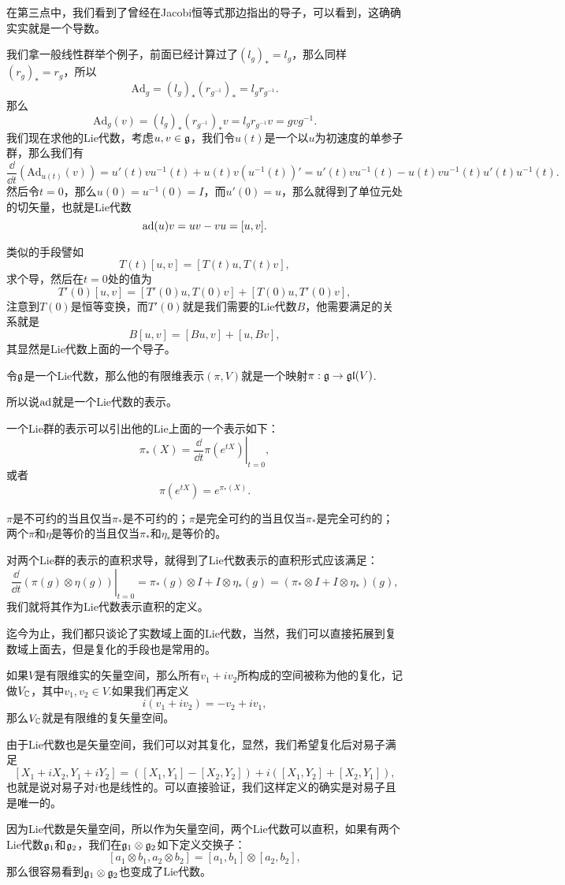 在第三点中，我们看到了曾经在Jacobi恒等式那边指出的导子，可以看到，这确确实实就是一个导数。

我们拿一般线性群举个例子，前面已经计算过了$(l_g)_*=l_g$，那么同样$(r_g)_*=r_g$，所以
\[
	\mathrm{Ad}_g=(l_g)_*(r_{g^{-1}})_*=l_gr_{g^{-1}}.
\]
那么
\[
	\mathrm{Ad}_g(v)=(l_g)_*(r_{g^{-1}})_*v=l_gr_{g^{-1}}v=gvg^{-1}.
\]
我们现在求他的Lie代数，考虑$u,v\in {\mathfrak{g}}$，我们令$u(t)$是一个以$u$为初速度的单参子群，那么我们有
\[
\frac{\dd}{\dd t}(\mathrm{Ad}_{u(t)}(v))=u'(t)vu^{-1}(t)+u(t)v(u^{-1}(t))'=u'(t)vu^{-1}(t)-u(t)vu^{-1}(t)u'(t)u^{-1}(t).
\]
然后令$t=0$，那么$u(0)=u^{-1}(0)=I$，而$u'(0)=u$，那么就得到了单位元处的切矢量，也就是Lie代数
\[
{\mathrm{ad}}(u)v=uv-vu=[u,v].
\]

类似的手段譬如
\[
T(t)[u,v]=[T(t)u,T(t)v],
\]
求个导，然后在$t=0$处的值为
\[
T'(0)[u,v]=[T'(0)u,T(0)v]+[T(0)u,T'(0)v],
\]
注意到$T(0)$是恒等变换，而$T'(0)$就是我们需要的Lie代数$B$，他需要满足的关系就是
\[
B[u,v]=[Bu,v]+[u,Bv],
\]
其显然是Lie代数上面的一个导子。


\para
令${\mathfrak{g}}$是一个Lie代数，那么他的有限维表示$(\pi,V)$就是一个映射$\pi:{\mathfrak{g}}\to\mathfrak{gl}(V)$.


所以说${\mathrm{ad}}$就是一个Lie代数的表示。

一个Lie群的表示可以引出他的Lie上面的一个表示如下：
\[
	\pi_*(X)=\left.\frac{\dd}{\dd t}\pi(e^{tX})\right|_{t=0},
\]
或者
\[
	\pi(e^{tX})=e^{\pi_*(X)}.
\]

\pro $\pi$是不可约的当且仅当$\pi_*$是不可约的；$\pi$是完全可约的当且仅当$\pi_*$是完全可约的；两个$\pi$和$\eta$是等价的当且仅当$\pi_*$和$\eta_*$是等价的。

对两个Lie群的表示的直积求导，就得到了Lie代数表示的直积形式应该满足：
\[
	\left.\frac{\dd}{\dd t}(\pi(g)\otimes \eta(g))\right|_{t=0}=\pi_*(g)\otimes I+I\otimes \eta_*(g)=(\pi_*\otimes I+I\otimes \eta_*)(g),
\]
我们就将其作为Lie代数表示直积的定义。

迄今为止，我们都只谈论了实数域上面的Lie代数，当然，我们可以直接拓展到复数域上面去，但是复化的手段也是常用的。


\para
如果$V$是有限维实的矢量空间，那么所有$v_1+iv_2$所构成的空间被称为他的复化，记做$V_{\mathbb{C}}$，其中$v_1,v_2\in V$.如果我们再定义
\[
i(v_1+iv_2)=-v_2+iv_1,
\]
那么$V_{\mathbb{C}}$就是有限维的复矢量空间。


由于Lie代数也是矢量空间，我们可以对其复化，显然，我们希望复化后对易子满足
\[
[X_1+iX_2,Y_1+iY_2]=([X_1,Y_1]-[X_2,Y_2])+i([X_1,Y_2]+[X_2,Y_1]),
\]
也就是说对易子对$i$也是线性的。可以直接验证，我们这样定义的确实是对易子且是唯一的。

因为Lie代数是矢量空间，所以作为矢量空间，两个Lie代数可以直积，如果有两个Lie代数${\mathfrak{g}}_1$和${\mathfrak{g}}_2$，我们在${\mathfrak{g}}_1\otimes{\mathfrak{g}}_2$如下定义交换子：
\[
[a_1\otimes b_1,a_2\otimes b_2]=[a_1,b_1]\otimes [a_2,b_2],
\]
那么很容易看到${\mathfrak{g}}_1\otimes{\mathfrak{g}}_2$也变成了Lie代数。

